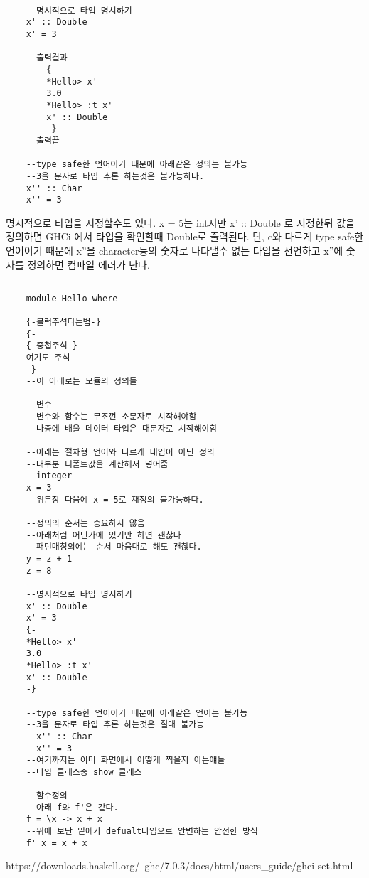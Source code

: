 \documentclass{article}
\begin{document}
\begin{verbatim}

    --명시적으로 타입 명시하기
    x' :: Double
    x' = 3
    
    --출력결과
        {-
        *Hello> x'
        3.0
        *Hello> :t x'
        x' :: Double
        -}
    --출력끝
    
    --type safe한 언어이기 때문에 아래같은 정의는 불가능
    --3을 문자로 타입 추론 하는것은 불가능하다.
    x'' :: Char
    x'' = 3
\end{verbatim}
    명시적으로 타입을 지정할수도 있다. x = 5는 int지만 x' :: Double 로 지정한뒤 값을 정의하면 GHCi 에서 타입을 확인할때 Double로 출력된다. 단, c와 다르게 type safe한 언어이기 때문에 x''을 character등의 숫자로 나타낼수 없는 타입을  선언하고 x''에 숫자를 정의하면 컴파일 에러가 난다.

\subsection{}
\begin{verbatim}
    module Hello where

    {-블럭주석다는법-}
    {-
    {-중첩주석-}
    여기도 주석
    -}
    --이 아래로는 모듈의 정의들
    
    --변수
    --변수와 함수는 무조껀 소문자로 시작해야함
    --나중에 배울 데이터 타입은 대문자로 시작해야함
    
    --아래는 절차형 언어와 다르게 대입이 아닌 정의
    --대부분 디폴트값을 계산해서 넣어줌
    --integer
    x = 3
    --위문장 다음에 x = 5로 재정의 불가능하다.
    
    --정의의 순서는 중요하지 않음
    --아래처럼 어딘가에 있기만 하면 괜찮다
    --패턴매칭외에는 순서 마음대로 해도 괜찮다.
    y = z + 1
    z = 8
    
    --명시적으로 타입 명시하기
    x' :: Double
    x' = 3
    {-
    *Hello> x'
    3.0
    *Hello> :t x'
    x' :: Double
    -}
    
    --type safe한 언어이기 때문에 아래같은 언어는 불가능
    --3을 문자로 타입 추론 하는것은 절대 불가능
    --x'' :: Char
    --x'' = 3
    --여기까지는 이미 화면에서 어떻게 찍을지 아는얘들
    --타입 클래스중 show 클래스 
    
    --함수정의
    --아래 f와 f'은 같다.
    f = \x -> x + x
    --위에 보단 밑에가 defualt타입으로 안변하는 안전한 방식
    f' x = x + x
\end{verbatim}







https://downloads.haskell.org/~ghc/7.0.3/docs/html/users\_guide/ghci-set.html
\end{document}

